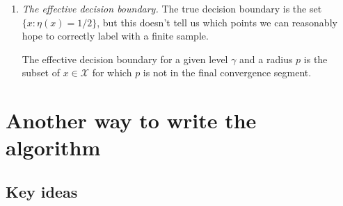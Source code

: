 \documentclass{article}
\def\X{{\mathcal X}}
\begin{document}
\begin{enumerate}
\item {\it The effective decision boundary.}
The true decision boundary is the set $\{x: \eta(x) = 1/2\}$, but this doesn't tell us which points we can reasonably hope to correctly label with a finite sample.

The effective decision boundary for a given level $\gamma$ and a radius $p$ is the subset of $x \in \X$ for which 
$p$ is not in the final convergence segment.

\end{enumerate}

\section{Another way to write the algorithm}
\label{sec:alg-2}

\subsection{Key ideas}
\end{document}
